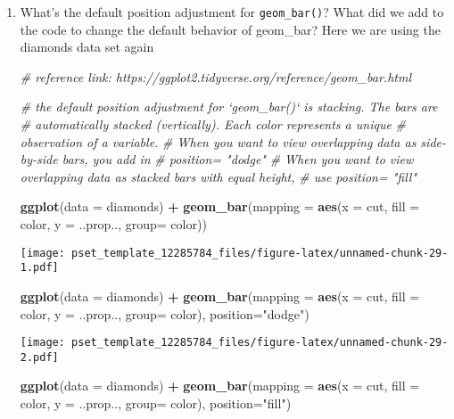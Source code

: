 \documentclass[
]{article}
\newenvironment{Shaded}{\begin{snugshade}}{\end{snugshade}}
\newcommand{\CommentTok}[1]{\textcolor[rgb]{0.56,0.35,0.01}{\textit{#1}}}
\newcommand{\DataTypeTok}[1]{\textcolor[rgb]{0.13,0.29,0.53}{#1}}
\newcommand{\KeywordTok}[1]{\textcolor[rgb]{0.13,0.29,0.53}{\textbf{#1}}}
\newcommand{\NormalTok}[1]{#1}
\newcommand{\OperatorTok}[1]{\textcolor[rgb]{0.81,0.36,0.00}{\textbf{#1}}}
\newcommand{\StringTok}[1]{\textcolor[rgb]{0.31,0.60,0.02}{#1}}
\begin{document}
\begin{enumerate}
\def\labelenumi{\arabic{enumi}.}
\item
  What's the default position adjustment for \texttt{geom\_bar()}? What
  did we add to the code to change the default behavior of geom\_bar?
  Here we are using the diamonds data set again

\begin{Shaded}
\begin{Highlighting}[]
\CommentTok{# reference link: https://ggplot2.tidyverse.org/reference/geom_bar.html}

\CommentTok{# the default position adjustment for `geom_bar()` is stacking. The bars are}
\CommentTok{# automatically stacked (vertically). Each color represents a unique }
\CommentTok{# observation of a variable.}
\CommentTok{# When you want to view overlapping data as side-by-side bars, you add in}
\CommentTok{# position= "dodge"}
\CommentTok{# When you want to view overlapping data as stacked bars with equal height,}
\CommentTok{# use position= "fill"}

\KeywordTok{ggplot}\NormalTok{(}\DataTypeTok{data =}\NormalTok{ diamonds) }\OperatorTok{+}\StringTok{ }
\StringTok{  }\KeywordTok{geom_bar}\NormalTok{(}\DataTypeTok{mapping =} \KeywordTok{aes}\NormalTok{(}\DataTypeTok{x =}\NormalTok{ cut, }\DataTypeTok{fill =}\NormalTok{ color, }\DataTypeTok{y =}\NormalTok{ ..prop.., }\DataTypeTok{group=}\NormalTok{ color))}
\end{Highlighting}
\end{Shaded}

  \texttt{[image: pset\_template\_12285784\_files/figure-latex/unnamed-chunk-29-1.pdf]}

\begin{Shaded}
\begin{Highlighting}[]
\KeywordTok{ggplot}\NormalTok{(}\DataTypeTok{data =}\NormalTok{ diamonds) }\OperatorTok{+}\StringTok{ }
\StringTok{  }\KeywordTok{geom_bar}\NormalTok{(}\DataTypeTok{mapping =} \KeywordTok{aes}\NormalTok{(}\DataTypeTok{x =}\NormalTok{ cut, }\DataTypeTok{fill =}\NormalTok{ color, }\DataTypeTok{y =}\NormalTok{ ..prop.., }\DataTypeTok{group=}\NormalTok{ color), }
           \DataTypeTok{position=}\StringTok{"dodge"}\NormalTok{)}
\end{Highlighting}
\end{Shaded}

  \texttt{[image: pset\_template\_12285784\_files/figure-latex/unnamed-chunk-29-2.pdf]}

\begin{Shaded}
\begin{Highlighting}[]
    \KeywordTok{ggplot}\NormalTok{(}\DataTypeTok{data =}\NormalTok{ diamonds) }\OperatorTok{+}\StringTok{ }
\StringTok{  }\KeywordTok{geom_bar}\NormalTok{(}\DataTypeTok{mapping =} \KeywordTok{aes}\NormalTok{(}\DataTypeTok{x =}\NormalTok{ cut, }\DataTypeTok{fill =}\NormalTok{ color, }\DataTypeTok{y =}\NormalTok{ ..prop.., }\DataTypeTok{group=}\NormalTok{ color), }
           \DataTypeTok{position=}\StringTok{"fill"}\NormalTok{)}
\end{Highlighting}
\end{Shaded}


\end{enumerate}
\end{document}
